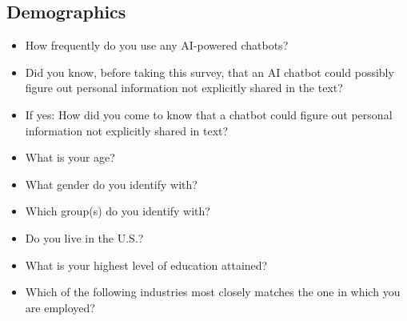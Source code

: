 \subsection{Demographics}
\begin{itemize}
    \item How frequently do you use any AI-powered chatbots?
    \item Did you know, before taking this survey, that an AI chatbot could possibly figure out personal information not explicitly shared in the text?
    \item If yes: How did you come to know that a chatbot could figure out personal information not explicitly shared in text?
    \item What is your age?
    \item What gender do you identify with?
    \item Which group(s) do you identify with?
    \item Do you live in the U.S.?
    \item What is your highest level of education attained?
    \item Which of the following industries most closely matches the one in which you are employed?
\end{itemize}

